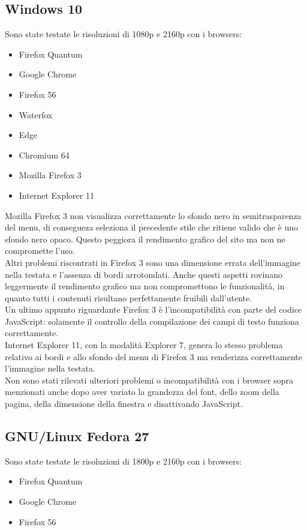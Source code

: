 \documentclass[openany, a4paper, 12pt]{report}
\begin{document}
				\subsection{Windows 10}
				Sono state testate le risoluzioni di 1080p e 2160p con i browsers:
				\begin{itemize}
					\item Firefox Quantum
					\item Google Chrome
					\item Firefox 56
					\item Waterfox
					\item Edge
					\item Chromium 64
					\item Mozilla Firefox 3
					\item Internet Explorer 11
				\end{itemize}
				Mozilla Firefox 3 non visualizza correttamente lo sfondo nero in semitrasparenza del menu, di consegueza seleziona il precedente stile che ritiene valido che è uno sfondo nero opaco. Questo peggiora il rendimento grafico del sito ma non ne compromette l'uso.\\
				Altri problemi riscontrati in Firefox 3 sono una dimensione errata dell'immagine nella testata e l'assenza di bordi arrotondati. Anche questi aspetti rovinano leggermente il rendimento grafico ma non compromettono le funzionalità, in quanto tutti i contenuti risultano perfettamente fruibili dall'utente.\\
				Un ultimo appunto riguardante Firefox 3 è l'incompatibilità con parte del codice JavaScript: solamente il controllo della compilazione dei campi di testo funziona correttamente.\\
				Internet Explorer 11, con la modalità Explorer 7, genera lo stesso problema relativo ai bordi e allo sfondo del menu di Firefox 3 ma renderizza correttamente l'immagine nella testata.\\
				Non sono stati rilevati ulteriori problemi o incompatibilità con i browser sopra menzionati anche  dopo aver variato la grandezza del font, dello zoom della pagina, della dimensione della finestra e disattivando JavaScript.

				\subsection{GNU/Linux Fedora 27}
				Sono state testate le risoluzioni di 1800p e 2160p con i browsers:
				\begin{itemize}
					\item Firefox Quantum
					\item Google Chrome
					\item Firefox 56
				\end{itemize}
\end{document}

